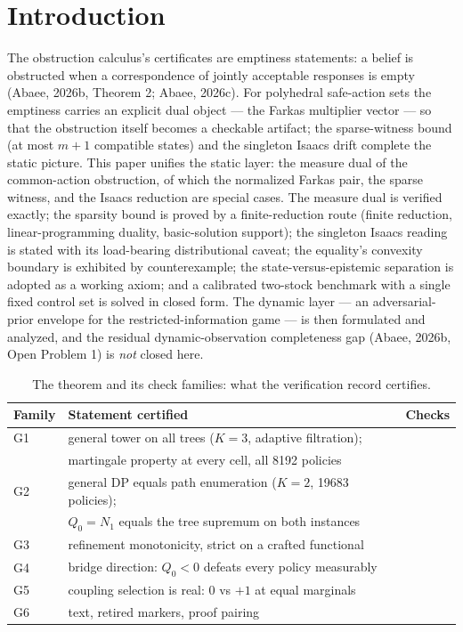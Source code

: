 \documentclass[10pt,twocolumn]{article}
\theoremstyle{definition}
\begin{document}
\section{Introduction}

The obstruction calculus's certificates are emptiness statements: a belief is
obstructed when a correspondence of jointly acceptable responses is empty
(Abaee, 2026b, Theorem 2; Abaee, 2026c). For polyhedral safe-action sets the
emptiness carries an explicit dual object --- the Farkas multiplier vector
--- so that the obstruction itself becomes a checkable artifact; the
sparse-witness bound (at most $m+1$ compatible states) and the singleton
Isaacs drift complete the static picture. This paper unifies the static layer: the measure dual of the common-action obstruction, of which the normalized Farkas pair, the sparse witness, and the Isaacs reduction are special cases. The measure dual is verified exactly; the sparsity bound is proved by a finite-reduction route (finite reduction, linear-programming duality, basic-solution support); the singleton Isaacs reading is stated with its load-bearing distributional caveat; the equality's convexity boundary is exhibited by counterexample; the state-versus-epistemic separation is adopted as a working axiom; and a calibrated two-stock benchmark with a single fixed control set is solved in closed form. The dynamic layer --- an adversarial-prior envelope for the restricted-information game --- is then formulated and analyzed, and the residual dynamic-observation completeness gap (Abaee, 2026b, Open Problem 1) is \emph{not} closed here.

\begin{table}[h]
\centering\footnotesize
\caption{The theorem and its check families: what the verification record
certifies.}
\label{tab:checks}
\begin{tabular}{@{}l p{4.6cm} l@{}}
\toprule
Family & Statement certified & Checks \\
\midrule
G1 & general tower on all trees ($K{=}3$, adaptive filtration); & \\
   & martingale property at every cell, all 8192 policies & \\
G2 & general DP equals path enumeration ($K{=}2$, 19683 policies); & \\
   & $Q_0 = N_1$ equals the tree supremum on both instances & \\
G3 & refinement monotonicity, strict on a crafted functional & \\
G4 & bridge direction: $Q_0 < 0$ defeats every policy measurably & \\
G5 & coupling selection is real: $0$ vs $+1$ at equal marginals & \\
G6 & text, retired markers, proof pairing & \\
\bottomrule
\end{tabular}
\end{table}
\end{document}
